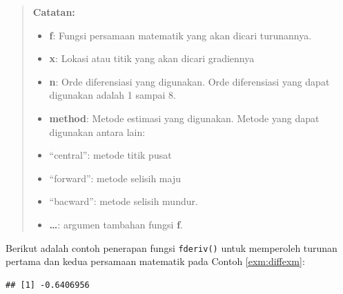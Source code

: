 \documentclass[]{book}
\newenvironment{Shaded}{\begin{snugshade}}{\end{snugshade}}
\newcommand{\CommentTok}[1]{\textcolor[rgb]{0.56,0.35,0.01}{\textit{#1}}}
\newcommand{\ControlFlowTok}[1]{\textcolor[rgb]{0.13,0.29,0.53}{\textbf{#1}}}
\newcommand{\DataTypeTok}[1]{\textcolor[rgb]{0.13,0.29,0.53}{#1}}
\newcommand{\DecValTok}[1]{\textcolor[rgb]{0.00,0.00,0.81}{#1}}
\newcommand{\KeywordTok}[1]{\textcolor[rgb]{0.13,0.29,0.53}{\textbf{#1}}}
\newcommand{\NormalTok}[1]{#1}
\newcommand{\OperatorTok}[1]{\textcolor[rgb]{0.81,0.36,0.00}{\textbf{#1}}}
\newcommand{\StringTok}[1]{\textcolor[rgb]{0.31,0.60,0.02}{#1}}
\providecommand{\tightlist}{%
  \setlength{\itemsep}{0pt}\setlength{\parskip}{0pt}}
\theoremstyle{definition}
\theoremstyle{definition}
\theoremstyle{definition}
\theoremstyle{remark}
\begin{document}
\begin{quote}
\textbf{Catatan:}

\begin{itemize}
\tightlist
\item
  \textbf{f}: Fungsi persamaan matematik yang akan dicari turunannya.
\item
  \textbf{x}: Lokasi atau titik yang akan dicari gradiennya
\item
  \textbf{n}: Orde diferensiasi yang digunakan. Orde diferensiasi yang dapat digunakan adalah 1 sampai 8.
\item
  \textbf{method}: Metode estimasi yang digunakan. Metode yang dapat digunakan antara lain:
\item
  ``central'': metode titik pusat
\item
  ``forward'': metode selisih maju
\item
  ``bacward'': metode selisih mundur.
\item
  \textbf{\ldots{}}: argumen tambahan fungsi \textbf{f}.
\end{itemize}
\end{quote}

Berikut adalah contoh penerapan fungsi \texttt{fderiv()} untuk memperoleh turunan pertama dan kedua persamaan matematik pada Contoh \ref{exm:diffexm}:

\begin{Shaded}
\end{Shaded}

\begin{verbatim}
## [1] -0.6406956
\end{verbatim}
\end{document}
